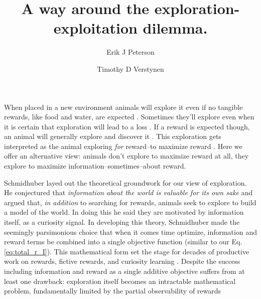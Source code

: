 \documentclass[9pt,twocolumn,twoside]{pnas-new}
\title{A way around the exploration-exploitation dilemma.}
\author[a,1]{Erik J Peterson}
\author[a,b]{Timothy D Verstynen}
\affil[a]{Department of Psychology}
\affil[b]{Center for the Neural Basis of Cognition, Carnegie Mellon University, Pittsburgh PA}
\begin{document}
\verticaladjustment{-2pt}
\maketitle


\thispagestyle{firststyle}
When placed in a new environment animals will explore it even if no tangible rewards, like food and water, are expected \cite{Liu2019,Jaegle,Todd2015}. Sometimes they'll explore even when it is certain that exploration will lead to a loss \cite{ZheWang2019}. If a reward is expected though, an animal will generally explore and discover it \cite{Todd2015}. This exploration gets interpreted as the animal exploring \textit{for} reward--to maximize reward \cite{Sutton2018}. Here we offer an alternative view: animals don't explore to maximize reward at all, they explore to maximize information--sometimes--about reward. 

Schmidhuber layed out the theoretical groundwork for our view of exploration. He conjectured that \textit{information about the world is valuable for its own sake} \cite{Schmidhuber1991} and argued that, \textit{in addition} to searching for rewards, animals seek to explore to build a model of the world. In doing this he said they are motivated by information itself, as a curiosity signal. In developing this theory, Schmidhuber made the seemingly parsimonious choice that when it comes time optimize, information and reward terms be combined into a single objective function (similar to our Eq.\ref{eq:total_r_I}). This mathematical form set the stage for decades of productive work on rewards, fictive rewards, and curiosity learning \cite{Pathak2017,Sutton1990,dayan1996exploration}. Despite the success including information and reward as a single additive objective suffers from at least one drawback: exploration itself becomes an intractable mathematical problem, fundamentally limited by the partial observability of rewards \cite{thrun1992active,dayan1996exploration,findling2018computational,gershman2018deconstructing} 
\end{document}
